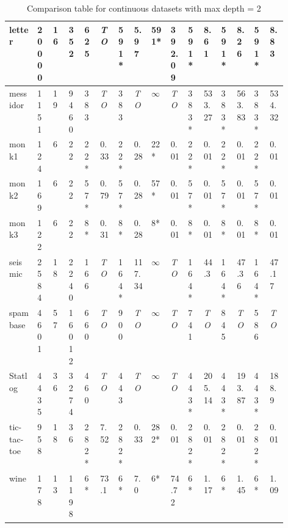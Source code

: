\begin{table*}
\begin{tabular}{|L{0.08\linewidth}|*{11}{C{0.03\linewidth}|}|*{2}{C{0.03\linewidth}|}|*{2}{C{0.03\linewidth}|}}
		\hline
		letter    & 20000    & 16    & 352    & 625    & \emph{TO}    & \bf 591*    & 5.97    & \bf 591*    & 392.09    & \bf  591*    & 8.61    & \bf 591*    & 8.26    & \bf 591*    & 8.83\\
		\hline
		messidor    & 1151    & 19    & 9460    & 383    & \emph{TO}    & 383    & \emph{TO}    & $\infty$    & \emph{TO}    & 383*    & 533.27    & 383*    & 563.83    & 383*    & 534.32\\
		\hline
		monk1    & 124    & 6    & 22    & 22*    & 0.33    & 22*    & 0.28    & 22*    & 0.01    & 22*    & 0.01    & 22*    & 0.01    & 22*    & 0.01\\
		\hline
		monk2    & 169    & 6    & 22    & 57*    & 0.79    & 57*    & 0.28    & 57*    & 0.01    & 57*    & 0.01    & 57*    & 0.01    & 57*    & 0.01\\
		\hline
		monk3    & 122    & 6    & 22    & 8*    & 0.31    & 8*    & 0.28    & 8*    & 0.01    & 8*    & 0.01    & 8*    & 0.01    & 8*    & 0.01\\
		\hline
		seismic    & 2584    & 18    & 2240    & 166    & \emph{TO}    & 164*    & 117.34    & $\infty$    & \emph{TO}    & 164*    & 44.3    & 164*    & 47.36    & 164*    & 47.17\\
		\hline
		spambase    & 4601    & 57    & 16012    & 660    & \emph{TO}    & 900    & \emph{TO}    & $\infty$    & \emph{TO}    & 741    & \emph{TO}    & 845    & \emph{TO}    & 586    & \emph{TO}\\
		\hline
		Statlog    & 4435    & 36    & 3274    & 460    & \emph{TO}    & 443    & \emph{TO}    & $\infty$    & \emph{TO}    & 443*    & 205.14    & 443*    & 193.87    & 443*    & 188.9\\
		\hline
		tic-tac-toe    & 958    & 18    & 36    & 282*    & 7.52    & 282*    & 0.33    & 282*    & 0.01    & 282*    & 0.01    & 282*    & 0.01    & 282*    & 0.01\\
		\hline
		wine    & 178    & 13    & 1198    & 6*    & 73.1    & 6*    & 7.0    & 6*    & 74.72    & 6*    & 1.17    & 6*    & 1.45    & 6*    & 1.09\\
		\hline
	\end{tabular}
	\caption{ Comparison table for continuous datasets with max depth = 2}
	\label{tab:3}
\end{table*}